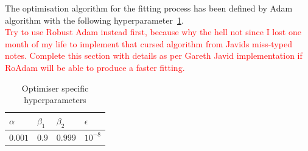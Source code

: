 %
%
The optimisation algorithm for the fitting process has been defined by Adam algorithm with the following hyperparameter~\ref{tab:adam-params}. \\
\textcolor{red}{Try to use Robust Adam instead first, because why the hell not since I lost one month of my life to implement that cursed algorithm from Javids miss-typed notes. Complete this section with details as per Gareth Javid implementation if RoAdam will be able to produce a faster fitting.}
\begin{table}[htbp]
    \centering
    \caption{Optimiser specific hyperparameters}
    \label{tab:adam-params}
    \begin{tabular}{ p{1.5cm} p{1.5cm} p{1.5cm} p{1.5cm}  }
        \hline
        $\alpha$ & $\beta_1 $ & $\beta_2$ & $\epsilon$ \\
        \hline
        $0.001$ & $0.9$ & $0.999$ & $10^{-8}$ \\%
        \hline
    \end{tabular}
\end{table}